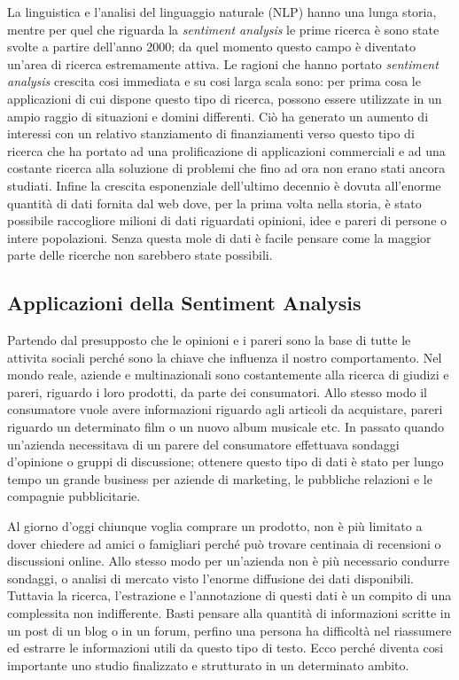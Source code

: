 \documentclass[a4paper,12pt,openright,twoside]{report}
\theoremstyle{definition}
\begin{document}
La linguistica e l'analisi del linguaggio naturale (NLP) hanno una lunga
storia, mentre per quel che riguarda la \emph{sentiment analysis} le prime ricerca
è sono state svolte a partire dell'anno 2000; da quel momento questo campo è diventato un'area
di ricerca estremamente attiva. 
Le ragioni che hanno portato \emph{sentiment analysis}
crescita cosi immediata e su cosi larga scala sono: per prima cosa le applicazioni
di cui dispone questo tipo di ricerca, possono essere utilizzate in un ampio raggio di 
situazioni e domini differenti. Ciò ha generato un aumento di interessi
con un relativo stanziamento di finanziamenti verso questo tipo di ricerca che ha portato ad una prolificazione di 
applicazioni commerciali e ad una costante ricerca alla soluzione di problemi
che fino ad ora non erano stati ancora studiati.
Infine la crescita esponenziale dell'ultimo decennio è dovuta all'enorme 
quantità di dati fornita dal web dove, per la prima volta nella storia, è stato possibile
raccogliore milioni di dati riguardati opinioni, idee e pareri di persone o intere 
popolazioni.
Senza questa mole di dati è facile pensare come la maggior parte delle ricerche non
sarebbero state possibili.

\subsection{Applicazioni della Sentiment Analysis}
Partendo dal presupposto che le opinioni e i pareri sono la base di tutte le attivita sociali perché sono la chiave
che influenza il nostro comportamento.
Nel mondo reale, aziende e multinazionali sono costantemente alla 
ricerca di giudizi e pareri, riguardo i loro prodotti, da parte dei consumatori.
Allo stesso modo il consumatore vuole avere informazioni riguardo agli articoli da
acquistare, pareri riguardo un determinato film o un nuovo album musicale etc.
In passato quando un'azienda necessitava di un parere del consumatore effettuava sondaggi
d'opinione o gruppi di discussione; ottenere questo tipo di dati è stato per lungo
tempo un grande business per aziende di marketing, le pubbliche relazioni e le compagnie pubblicitarie.

Al giorno d'oggi chiunque voglia comprare un prodotto, non è più limitato a dover chiedere
ad amici o famigliari perché può trovare centinaia di recensioni o discussioni online.
Allo stesso modo per un'azienda non è più necessario condurre sondaggi, o analisi di mercato
visto l'enorme diffusione dei dati disponibili.
Tuttavia la ricerca, l'estrazione e l'annotazione di questi dati è un compito di una complessita non indifferente.
Basti pensare alla quantità di informazioni scritte in un post di un blog o in un forum,
perfino una persona ha difficoltà nel riassumere ed estrarre le informazioni utili da questo
tipo di testo. Ecco perché diventa cosi importante uno studio finalizzato e strutturato in un 
determinato ambito.
\end{document}
